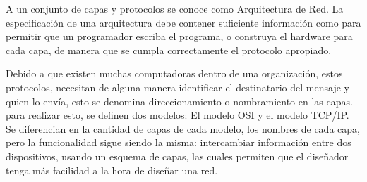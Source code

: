 A un conjunto de capas y protocolos se conoce como Arquitectura de Red. La especificación de una arquitectura debe contener suficiente información como para permitir que un programador escriba el programa, o construya el hardware para cada capa, de manera que se cumpla correctamente el protocolo apropiado.

Debido a que existen muchas computadoras dentro de una organización, estos protocolos, necesitan de alguna manera identificar el destinatario del mensaje y quien lo envía, esto se denomina direccionamiento o nombramiento en las capas. para realizar esto, se definen dos modelos: El modelo OSI y el modelo TCP/IP. Se diferencian en la cantidad de capas de cada modelo, los nombres de cada capa, pero la funcionalidad sigue siendo la misma: intercambiar información entre dos dispositivos, usando un esquema de capas, las cuales permiten que el diseñador tenga más facilidad a la hora de diseñar una red. 



